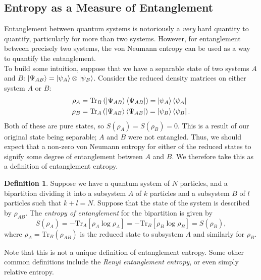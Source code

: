 \documentclass[12pt,a4paper]{report}
\numberwithin{equation}{section}
\newcommand{\ketbra}[2]{\ket{#1}\bra{#2}}
\newcommand{\ketbras}[1]{\ketbra{#1}{#1}}
\newcommand{\tr}{\text{Tr}}
\theoremstyle{definition}
\newtheorem{definition}{Definition}[section]
\theoremstyle{theorem}
\theoremstyle{theorem}
\theoremstyle{example}
\theoremstyle{definition}
\begin{document}
\subsection{Entropy as a Measure of Entanglement}
Entanglement between quantum systems is notoriously a \textit{very} hard quantity to quantify, particularly for more than two systems. However, for entanglement between precisely two systems, the von Neumann entropy can be used as a way to quantify the entanglement.\\
To build some intuition, suppose that we have a separable state of two systems $A$ and $B$: $\ket{\Psi_{AB}}=\ket{\psi_{A}}\otimes\ket{\psi_{B}}$. Consider the reduced density matrices on either system $A$ or $B$:
\begin{equation}
	\begin{aligned}
		\rho_{A}&=\tr_{B}\left(\ketbras{\Psi_{AB}}\right)=\ketbras{\psi_{A}}\\
		\rho_{B}&=\tr_{A}\left(\ketbras{\Psi_{AB}}\right)=\ketbras{\psi_{B}}.
	\end{aligned}
\end{equation}
Both of these are pure states, so $S(\rho_{A})=S(\rho_{B})=0$. This is a result of our original state being separable; $A$ and $B$ were not entangled. Thus, we should expect that a non-zero von Neumann entropy for either of the reduced states to signify some degree of entanglement between $A$ and $B$. We therefore take this as a definition of entanglement entropy.
\begin{definition}
	Suppose we have a quantum system of $N$ particles, and a bipartition dividing it into a subsystem $A$ of $k$ particles and a subsystem $B$ of $l$ particles such that $k+l=N$. Suppose that the state of the system is described by $\rho_{AB}$. The \textit{entropy of entanglement} for the bipartition is given by
	\begin{equation}
		S(\rho_{A})=-\tr_{A}\left[\rho_{A}\log\rho_{A}\right]=-\tr_{B}\left[\rho_{B}\log\rho_{B}\right]=S(\rho_{B}),
	\end{equation}
	where $\rho_{A}=\tr_{B}\left(\rho_{AB}\right)$ is the reduced state to subsystem $A$ and similarly for $\rho_{B}$.
\end{definition}
Note that this is not a unique definition of entanglement entropy. Some other common definitions include the \textit{Renyi entanglement entropy}\cite{Renyi}, or even simply relative entropy.
\end{document}
